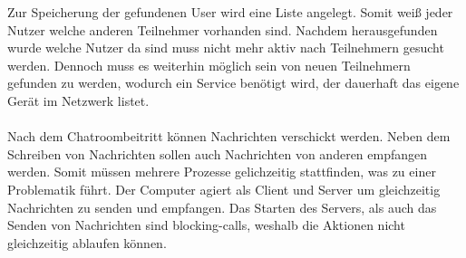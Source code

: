 Zur Speicherung der gefundenen User wird eine Liste angelegt. Somit weiß jeder Nutzer welche anderen Teilnehmer vorhanden sind. 
Nachdem herausgefunden wurde welche Nutzer da sind muss nicht mehr aktiv nach Teilnehmern gesucht werden. 
Dennoch muss es weiterhin möglich sein von neuen Teilnehmern gefunden zu werden, wodurch ein Service benötigt wird, der dauerhaft das eigene Gerät im Netzwerk listet.
\\
\\
Nach dem Chatroombeitritt können Nachrichten verschickt werden. 
Neben dem Schreiben von Nachrichten sollen auch Nachrichten von anderen empfangen werden. 
Somit müssen mehrere Prozesse gelichzeitig stattfinden, was zu einer Problematik führt. 
Der Computer agiert als Client und Server um gleichzeitig Nachrichten zu senden und empfangen. 
Das Starten des Servers, als auch das Senden von Nachrichten sind blocking-calls, weshalb die Aktionen nicht gleichzeitig ablaufen können.

